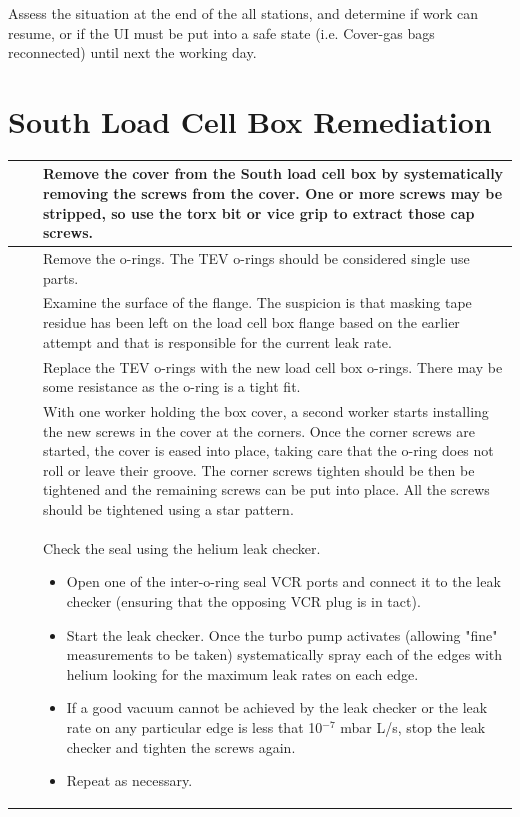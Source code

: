 \documentclass[11pt]{article}
\begin{document}
Assess the situation at the end of the all stations, and determine if work can resume, or if the UI must be put into a safe state (i.e. Cover-gas bags reconnected) until next the working day.



\section{South Load Cell Box Remediation}
\newcommand\southE{\stepcounter{southEcounter}\thesouthEcounter}
\begin{tabular}{|c|c|p{15cm}|}
\hline\southE & & Remove the cover from the South load cell box by systematically removing the screws from the cover. One or more screws may be stripped, so use the torx bit  or vice grip to extract those cap screws.\\ 
\hline\southE & & Remove the o-rings. The TEV o-rings should be considered single use parts.\\
\hline\southE & & Examine the surface of the flange. The suspicion is that masking tape residue has been left on the load cell box flange based on the earlier attempt and that is responsible for the current leak rate.\\
\hline\southE & & Replace the TEV o-rings with the new load cell box o-rings. There may be some resistance as the o-ring is a tight fit.  \\
\hline\southE & & With one worker holding the box cover, a second worker starts installing the new screws in the cover at the corners. Once the corner screws are started, the cover is eased into place, taking care that the o-ring does not roll or leave their groove. The corner screws tighten should be then be tightened and the remaining screws can be put into place. All the screws should be tightened using a star pattern.\\
\hline\southE & & Check the seal using the helium leak checker.
\begin{itemize}
\item Open one of the inter-o-ring seal VCR ports and connect it to the leak checker (ensuring that the opposing VCR plug is in tact). 
\item Start the leak checker. Once the turbo pump activates (allowing "fine" measurements to be taken) systematically spray each of the edges with helium  looking for the maximum leak rates on each edge. 
\item If a good vacuum cannot be achieved by the leak checker or the leak rate on any particular edge is less that 10$^{-7}$ mbar L/s, stop the leak checker and tighten the screws again. 
\item Repeat as necessary.
\end{itemize}
\vspace{-0.2cm}
\\
\hline
\end{tabular}
\end{document}

